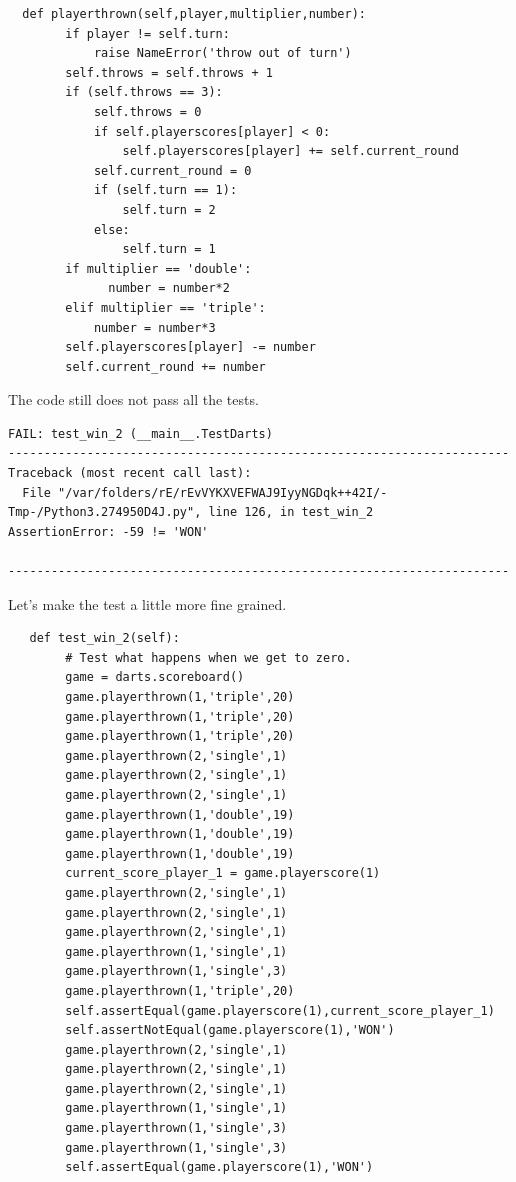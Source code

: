 \documentclass{paper}
\begin{document}
\begin{lstlisting}
  def playerthrown(self,player,multiplier,number):
        if player != self.turn:
            raise NameError('throw out of turn')
        self.throws = self.throws + 1
        if (self.throws == 3):
            self.throws = 0
            if self.playerscores[player] < 0:
                self.playerscores[player] += self.current_round                
            self.current_round = 0
            if (self.turn == 1):
                self.turn = 2
            else:
                self.turn = 1
        if multiplier == 'double':
              number = number*2
        elif multiplier == 'triple':
            number = number*3
        self.playerscores[player] -= number
        self.current_round += number
\end{lstlisting}
The code still does not pass all the tests.
\begin{verbatim}
FAIL: test_win_2 (__main__.TestDarts)
----------------------------------------------------------------------
Traceback (most recent call last):
  File "/var/folders/rE/rEvVYKXVEFWAJ9IyyNGDqk++42I/-Tmp-/Python3.274950D4J.py", line 126, in test_win_2
AssertionError: -59 != 'WON'

----------------------------------------------------------------------
\end{verbatim}
Let's make the test a little more fine grained.
\begin{lstlisting}
   def test_win_2(self):
        # Test what happens when we get to zero.
        game = darts.scoreboard()
        game.playerthrown(1,'triple',20)
        game.playerthrown(1,'triple',20)
        game.playerthrown(1,'triple',20)
        game.playerthrown(2,'single',1)
        game.playerthrown(2,'single',1)
        game.playerthrown(2,'single',1)
        game.playerthrown(1,'double',19)
        game.playerthrown(1,'double',19)
        game.playerthrown(1,'double',19)
        current_score_player_1 = game.playerscore(1)
        game.playerthrown(2,'single',1)
        game.playerthrown(2,'single',1)
        game.playerthrown(2,'single',1)
        game.playerthrown(1,'single',1)
        game.playerthrown(1,'single',3)
        game.playerthrown(1,'triple',20)
        self.assertEqual(game.playerscore(1),current_score_player_1)
        self.assertNotEqual(game.playerscore(1),'WON')
        game.playerthrown(2,'single',1)
        game.playerthrown(2,'single',1)
        game.playerthrown(2,'single',1)
        game.playerthrown(1,'single',1)
        game.playerthrown(1,'single',3)
        game.playerthrown(1,'single',3)
        self.assertEqual(game.playerscore(1),'WON')
\end{lstlisting}
\end{document}
